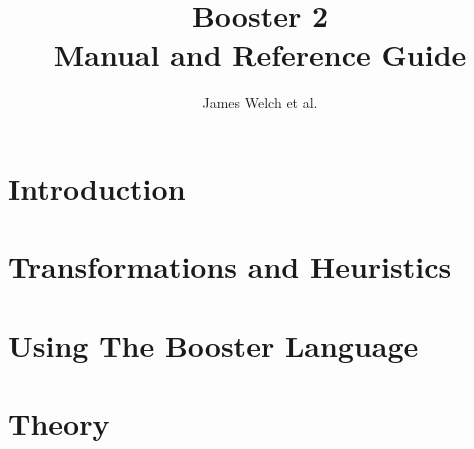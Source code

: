 \documentclass[12pt]{ociamthesis}  %
\title{Booster 2\\[1ex]Manual and Reference Guide}   %
\author{James Welch et al.}             %
\begin{document}
\setlength{\tabcolsep}{10pt}



\setcounter{secnumdepth}{3}
\setcounter{tocdepth}{3}


\maketitle                  %

\begin{romanpages}          %
\tableofcontents            %
\listoffigures              %
\end{romanpages}            %

\part{Introduction}






\part{Transformations and Heuristics}




\part{Using The Booster Language}







\part{Theory}
\end{document}
